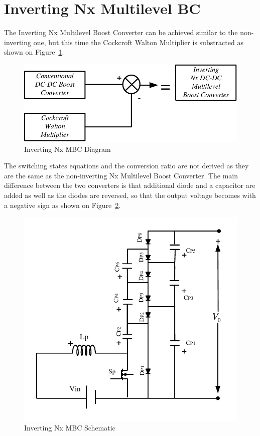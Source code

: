 \section{Inverting Nx Multilevel BC}\label{ch:IMBC}

The Inverting Nx Multilevel Boost Converter can be achieved similar to the non-inverting one, but this time the Cockcroft Walton Multiplier is substracted as shown on Figure~\ref{fig:MBC_CW_CBCtoINx}. \cite{Bhaskar2016}

\begin{figure}[H]
   \centering
   \includegraphics[width=\textwidth]{figures/yMultilevel/InvertingNxDiagram.pdf}
    \caption{Inverting Nx MBC Diagram}
	\label{fig:MBC_CW_CBCtoINx}
\end{figure}

The switching states equations and the conversion ratio are not derived as they are the same as the non-inverting Nx Multilevel Boost Converter. The main difference between the two converters is that additional diode and a capacitor are added as well as the diodes are reversed, so that the output voltage becomes with a negative sign as shown on Figure~\ref{fig:MBC_InvertingNx}.

\begin{figure}[H]
   \centering
   \includegraphics[width=\textwidth]{figures/yMultilevel/InvertingMBCforReport2.pdf}
    \caption{Inverting Nx MBC Schematic}
	\label{fig:MBC_InvertingNx}
\end{figure}

